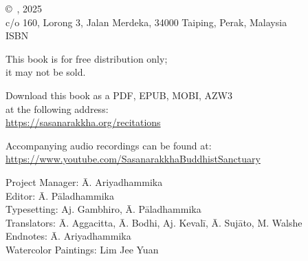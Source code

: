 
\cleartoverso
\thispagestyle{empty}

{%

  \ifafive \fontsize{10}{16}\selectfont \fi
  \ifninebythirteen \fontsize{7.5}{11}\selectfont \fi
  \ifbfive \fontsize{12}{20}\selectfont \fi
  \centering
  \setlength{\parindent}{0pt}%

  \ifafive \vspace{0.5cm} \fi
  \ifninebythirteen \vspace{0.4cm} \fi
  \ifbfive \vspace{0.5cm} \fi

  \copyright\ \thePublisher, 2025\\
  c/o 160, Lorong 3, Jalan Merdeka, 34000 Taiping, Perak, Malaysia\\
  \ifdigital
    \else
  ISBN \theISBN
  \fi

  \ifafive \vspace{0.5cm} \fi
  \ifninebythirteen \vspace{0.3cm} \fi
  \ifbfive \vspace{0.5cm} \fi

  This book is for free distribution only;\\
  it may not be sold.

  \ifafive \vspace{0.5cm} \fi
  \ifninebythirteen \vspace{0.3cm} \fi
  \ifbfive \vspace{0.5cm} \fi

  Download this book as a PDF, EPUB, MOBI, AZW3\\
  at the following address:\\
  \href{https://sasanarakkha.org/recitations}{https://sasanarakkha.org/recitations}

Accompanying audio recordings can be found at:
\href{https://www.youtube.com/SasanarakkhaBuddhistSanctuary}{https://www.youtube.com/SasanarakkhaBuddhistSanctuary}

  \ifafive \vspace{0.5cm} \fi
  \ifninebythirteen \vspace{0.3cm} \fi
  \ifbfive \vspace{0.5cm} \fi

  Project Manager: Ā. Ariyadhammika\\
  Editor: Ā. Pāladhammika\\
  Typesetting: Aj. Gambhiro, Ā. Pāladhammika\\
  Translators: Ā. Aggacitta, Ā. Bodhi, Aj. Kevalī, Ā. Sujāto, M. Walshe\\
  Endnotes: Ā. Ariyadhammika\\
  Watercolor Paintings: Lim Jee Yuan

}

